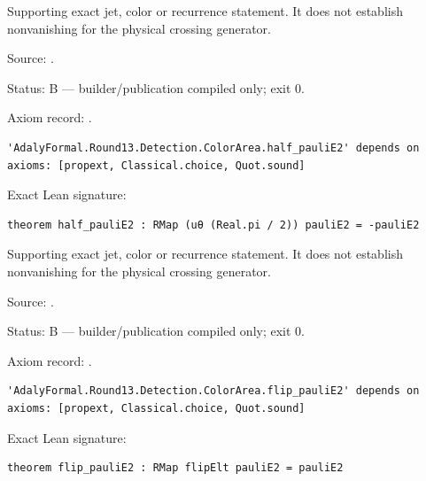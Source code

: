 \begin{theorem}[bp-522]
\label{bp-522}
\uses{}
\leanok
Supporting exact jet, color or recurrence statement. It does not establish nonvanishing for the physical crossing generator.

\par Source: \texttt{}.
\par Status: B — builder/publication compiled only; exit 0.
\par Axiom record: \texttt{}.
\begin{verbatim}
'AdalyFormal.Round13.Detection.ColorArea.half_pauliE2' depends on axioms: [propext, Classical.choice, Quot.sound]
\end{verbatim}
\par Exact Lean signature:
\begin{verbatim}
theorem half_pauliE2 : RMap (uθ (Real.pi / 2)) pauliE2 = -pauliE2
\end{verbatim}
\end{theorem}

\begin{theorem}[bp-523]
\label{bp-523}
\uses{}
\leanok
Supporting exact jet, color or recurrence statement. It does not establish nonvanishing for the physical crossing generator.

\par Source: \texttt{}.
\par Status: B — builder/publication compiled only; exit 0.
\par Axiom record: \texttt{}.
\begin{verbatim}
'AdalyFormal.Round13.Detection.ColorArea.flip_pauliE2' depends on axioms: [propext, Classical.choice, Quot.sound]
\end{verbatim}
\par Exact Lean signature:
\begin{verbatim}
theorem flip_pauliE2 : RMap flipElt pauliE2 = pauliE2
\end{verbatim}
\end{theorem}

